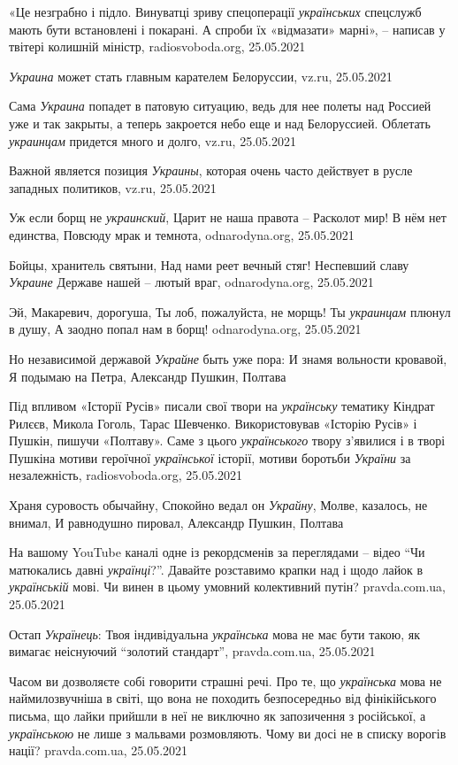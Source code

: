 «Це незграбно і підло. Винуватці зриву спецоперації \emph{українських}
спецслужб мають бути встановлені і покарані. А спроби їх «відмазати» марні», –
написав у твітері колишній міністр, radiosvoboda.org, 25.05.2021

\emph{Украина} может стать главным карателем Белоруссии, vz.ru, 25.05.2021

Сама \emph{Украина} попадет в патовую ситуацию, ведь для нее полеты над Россией
уже и так закрыты, а теперь закроется небо еще и над Белоруссией. Облетать
\emph{украинцам} придется много и долго, vz.ru, 25.05.2021

Важной является позиция \emph{Украины}, которая очень часто действует в русле западных политиков,
vz.ru, 25.05.2021

Уж если борщ не \emph{украинский}, Царит не наша правота – Расколот мир! В нём нет
единства, Повсюду мрак и темнота, odnarodyna.org, 25.05.2021

Бойцы, хранитель святыни, Над нами реет вечный стяг!  Неспевший славу \emph{Украине}
Державе нашей – лютый враг, odnarodyna.org, 25.05.2021

Эй, Макаревич, дорогуша, Ты лоб, пожалуйста, не морщь!  Ты \emph{украинцам} плюнул в
душу, А заодно попал нам в борщ!
odnarodyna.org, 25.05.2021

Но независимой державой \emph{Украйне} быть уже пора: И знамя вольности
кровавой, Я подымаю на Петра, Александр Пушкин, Полтава

Під впливом «Історії Русів» писали свої твори на \emph{українську} тематику
Кіндрат Рилєєв, Микола Гоголь, Тарас Шевченко. Використовував «Історію Русів» і
Пушкін, пишучи «Полтаву». Саме з цього \emph{українського} твору з'явилися і в
творі Пушкіна мотиви героїчної \emph{української} історії, мотиви боротьби
\emph{України} за незалежність, radiosvoboda.org, 25.05.2021

Храня суровость обычайну, Спокойно ведал он \emph{Украйну}, Молве, казалось, не
внимал, И равнодушно пировал, Александр Пушкин, Полтава

На вашому YouTube каналі одне із рекордсменів за переглядами – відео
\enquote{Чи матюкались давні \emph{українці}?}. Давайте розставимо крапки над і
щодо лайок в \emph{українській} мові. Чи винен в цьому умовний колективний
путін?  pravda.com.ua, 25.05.2021

Остап \emph{Українець}: Твоя індивідуальна \emph{українська} мова не має бути такою, як
вимагає неіснуючий \enquote{золотий стандарт}, pravda.com.ua, 25.05.2021

Часом ви дозволяєте собі говорити страшні речі. Про те, що \emph{українська}
мова не наймилозвучніша в світі, що вона не походить безпосередньо від
фінікійського письма, що лайки прийшли в неї не виключно як запозичення з
російської, а \emph{українською} не лише з мальвами розмовляють. Чому ви досі
не в списку ворогів нації? pravda.com.ua, 25.05.2021

